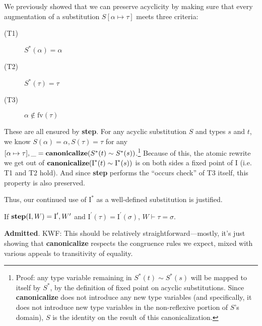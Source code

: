 \documentclass[10pt, letterpaper, oneside]{article}
\newcommand{\inertset}{\text{I}}
\newcommand{\fv}{\mathrm{fv}}
\newcommand{\Admitted}{{\color{red}\bf Admitted}}
\newcommand{\kwf}[1]{{\color{blue}KWF: #1}}
\begin{document}
We previously showed that we can preserve acyclicity by making sure that every augmentation of a substitution \(S[\alpha \mapsto \tau]\) meets three criteria:
\begin{description}
\item[(T1)] \(S^\ast(\alpha) = \alpha\)
\item[(T2)] \(S^\ast(\tau) = \tau\)
\item[(T3)] \(\alpha \notin \fv(\tau)\)
\end{description}
These are all ensured by \textbf{step}. For any acyclic substitution \(S\) and types \(s\) and \(t\), we know \(S(\alpha) = \alpha, S(\tau) = \tau\) for any \([\alpha \mapsto \tau], \_ = \text{\bf canonicalize}(S^\ast(t) \sim S^\ast(s))\).\footnote{Proof: any type variable remaining in \(S^\ast(t) \sim S^\ast(s)\) will be mapped to itself by \(S^\ast\), by the definition of fixed point on acyclic substitutions. Since \textbf{canonicalize} does not introduce any new type variables (and specifically, it does not introduce new type variables in the non-reflexive portion of \(S\)'s domain), \(S\) is the identity on the result of this canonicalization.} Because of this, the atomic rewrite we get out of \(\text{\bf canonicalize}(\inertset^\ast(t) \sim \inertset^\ast(s))\) is on both sides a fixed point of \(\inertset\) (i.e. T1 and T2 hold). And since \textbf{step} performs the ``occurs check'' of T3 itself, this property is also preserved.

Thus, our continued use of \(\inertset^\ast\) as a well-defined substitution is justified.

\begin{theorem}
  \label{theorem:step-sound}
  If \(\text{\bf step}(\inertset, W) = \inertset^\prime, W^\prime\) and \(\inertset^\prime(\tau) = \inertset^\prime(\sigma)\), \(W \vdash \tau = \sigma\).
\end{theorem}

\Admitted. \kwf{This should be relatively straightforward---mostly, it's just showing that {\bf canonicalize} respects the congruence rules we expect, mixed with various appeals to transitivity of equality.}

\end{document}
